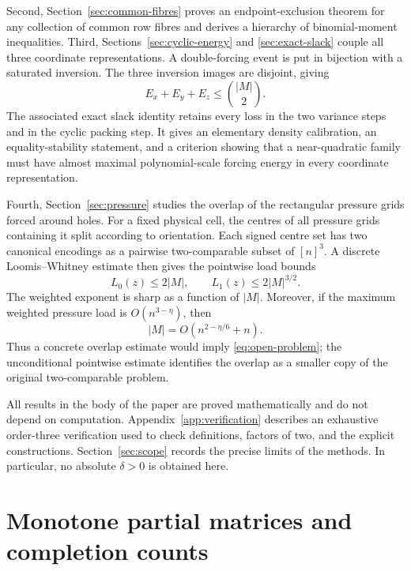 \documentclass[11pt]{article}
\numberwithin{equation}{section}
\theoremstyle{definition}
\theoremstyle{remark}
\begin{document}
Second, Section~\ref{sec:common-fibres} proves an endpoint-exclusion theorem for
any collection of common row fibres and derives a hierarchy of binomial-moment
inequalities.  Third, Sections~\ref{sec:cyclic-energy} and
\ref{sec:exact-slack} couple all three coordinate representations.  A
double-forcing event is put in bijection with a saturated inversion.  The
three inversion images are disjoint, giving
\begin{equation}\label{eq:intro-cyclic}
 E_x+E_y+E_z\le \binom{|M|}{2}.
\end{equation}
The associated exact slack identity retains every loss in the two variance
steps and in the cyclic packing step.  It gives an elementary density
calibration, an equality-stability statement, and a criterion showing that a
near-quadratic family must have almost maximal polynomial-scale forcing energy
in every coordinate representation.

Fourth, Section~\ref{sec:pressure} studies the overlap of the rectangular
pressure grids forced around holes.  For a fixed physical cell, the centres of
all pressure grids containing it split according to orientation.  Each signed
centre set has two canonical encodings as a pairwise two-comparable subset of
$[n]^3$.  A discrete Loomis--Whitney estimate then gives the pointwise load
bounds
\begin{equation}\label{eq:intro-load}
 L_0(z)\le 2|M|,\qquad L_1(z)\le 2|M|^{3/2}.
\end{equation}
The weighted exponent is sharp as a function of $|M|$.  Moreover, if the
maximum weighted pressure load is $O(n^{3-\eta})$, then
\[
 |M|=O(n^{2-\eta/6}+n).
\]
Thus a concrete overlap estimate would imply \eqref{eq:open-problem}; the
unconditional pointwise estimate identifies the overlap as a smaller copy of
the original two-comparable problem.

All results in the body of the paper are proved mathematically and do not
depend on computation.  Appendix~\ref{app:verification} describes an exhaustive
order-three verification used to check definitions, factors of two, and the
explicit constructions.  Section~\ref{sec:scope} records the precise limits of
the methods.  In particular, no absolute $\delta>0$ is obtained here.

\section{Monotone partial matrices and completion counts}
\label{sec:preliminaries}
\end{document}
